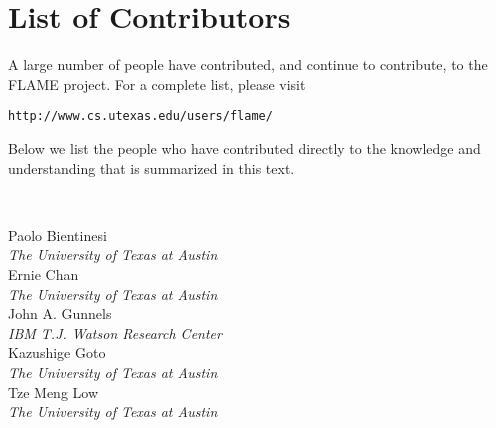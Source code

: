 \cleardoublepage

\frontmatter

\setcounter{page}{1}

%
%


\setcounter{tocdepth}{3}
\setcounter{secnumdepth}{3}
\tableofcontents


\cleardoublepage
\chapter*{List of Contributors}

A large number of people have contributed, and continue to contribute,
to the FLAME project.  For a complete list, please visit
\vspace{0.1in}
\begin{center}
\tt http://www.cs.utexas.edu/users/flame/
\end{center}
\vspace{0.1in}
\noindent
Below we list the people who have contributed directly to the knowledge and
understanding that is summarized in this text.  

~
\vspace{0.5in}
~

\noindent
Paolo Bientinesi\\
{\em The University of Texas at Austin}\\

\noindent
Ernie Chan\\
{\em The University of Texas at Austin}\\

\noindent
John A. Gunnels\\
{\em IBM T.J. Watson Research Center}\\

\noindent
Kazushige Goto\\
{\em The University of Texas at Austin}\\

\noindent
Tze Meng Low\\
{\em The University of Texas at Austin}\\

